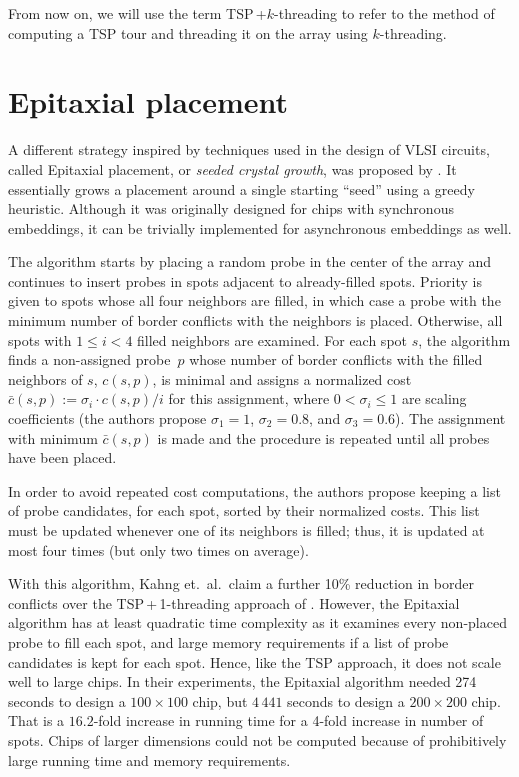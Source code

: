 From now on, we will use the term TSP\,+$k$-threading to refer to the method of
computing a TSP tour and threading it on the array using $k$-threading.

\section{Epitaxial placement}
\label{sec:placement_epitaxial}

A different strategy inspired by techniques used in the design of VLSI circuits,
called Epitaxial placement, or \emph{seeded crystal growth}, was proposed by
\citet{Kahng2002}. It essentially grows a placement around a single starting
``seed'' using a greedy heuristic. Although it was originally designed for chips
with synchronous embeddings, it can be trivially implemented for asynchronous
embeddings as well.

The algorithm starts by placing a random probe in the center of the array and
continues to insert probes in spots adjacent to already-filled spots. Priority
is given to spots whose all four neighbors are filled, in which case a probe
with the minimum number of border conflicts with the neighbors is placed.
Otherwise, all spots with $1 \leq i < 4$ filled neighbors are examined. For each
spot $s$, the algorithm finds a non-assigned probe~$p$ whose number of border
conflicts with the filled neighbors of $s$, $c(s,p)$, is minimal and assigns a
normalized cost $\bar{c}(s,p) := \sigma_i \cdot c(s,p) / i$ for this assignment,
where $0 < \sigma_i \leq 1$ are scaling coefficients (the authors propose
$\sigma_1 = 1$, $\sigma_2 = 0.8$, and $\sigma_3 = 0.6$). The assignment with
minimum $\bar{c}(s,p)$ is made and the procedure is repeated until all probes
have been placed.

In order to avoid repeated cost computations, the authors propose keeping a list
of probe candidates, for each spot, sorted by their normalized costs. This list
must be updated whenever one of its neighbors is filled; thus, it is updated at
most four times (but only two times on average).

With this algorithm, Kahng et.~al.\ claim a further 10\% reduction in
border conflicts over the TSP\,+\,1-threading approach of
\citet{Hannenhalli2002}. However, the Epitaxial algorithm has
at least quadratic time complexity as it examines every non-placed probe to fill
each spot, and large memory requirements if a list of probe candidates is kept
for each spot. Hence, like the TSP approach, it does not scale well to large
chips. In their experiments, the Epitaxial algorithm needed 274 seconds to
design a $100\times 100$ chip, but $4\,441$ seconds to design a $200\times 200$
chip. That is a $16.2$-fold increase in running time for a 4-fold increase in
number of spots. Chips of larger dimensions could not be computed because of
prohibitively large running time and memory requirements.

